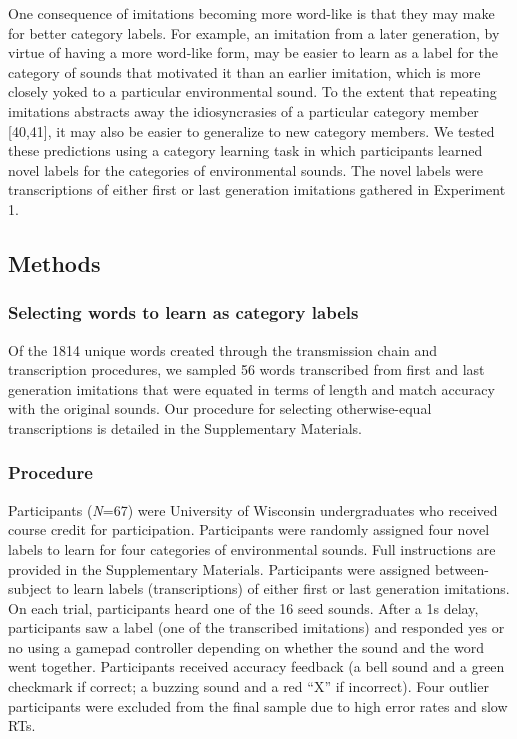 \documentclass[english,floatsintext,man]{apa6}
\theoremstyle{definition}
\theoremstyle{definition}
\theoremstyle{definition}
\theoremstyle{remark}
\begin{document}
One consequence of imitations becoming more word-like is that they may
make for better category labels. For example, an imitation from a later
generation, by virtue of having a more word-like form, may be easier to
learn as a label for the category of sounds that motivated it than an
earlier imitation, which is more closely yoked to a particular
environmental sound. To the extent that repeating imitations abstracts
away the idiosyncrasies of a particular category member {[}40,41{]}, it
may also be easier to generalize to new category members. We tested
these predictions using a category learning task in which participants
learned novel labels for the categories of environmental sounds. The
novel labels were transcriptions of either first or last generation
imitations gathered in Experiment 1.

\hypertarget{methods-2}{%
\subsection{Methods}\label{methods-2}}

\hypertarget{selecting-words-to-learn-as-category-labels}{%
\subsubsection{Selecting words to learn as category
labels}\label{selecting-words-to-learn-as-category-labels}}

Of the 1814 unique words created through the transmission chain and
transcription procedures, we sampled 56 words transcribed from first and
last generation imitations that were equated in terms of length and
match accuracy with the original sounds. Our procedure for selecting
otherwise-equal transcriptions is detailed in the Supplementary
Materials.

\hypertarget{procedure}{%
\subsubsection{Procedure}\label{procedure}}

Participants (\emph{N}=67) were University of Wisconsin undergraduates
who received course credit for participation. Participants were randomly
assigned four novel labels to learn for four categories of environmental
sounds. Full instructions are provided in the Supplementary Materials.
Participants were assigned between-subject to learn labels
(transcriptions) of either first or last generation imitations. On each
trial, participants heard one of the 16 seed sounds. After a 1s delay,
participants saw a label (one of the transcribed imitations) and
responded yes or no using a gamepad controller depending on whether the
sound and the word went together. Participants received accuracy
feedback (a bell sound and a green checkmark if correct; a buzzing sound
and a red \enquote{X} if incorrect). Four outlier participants were
excluded from the final sample due to high error rates and slow RTs.
\end{document}
